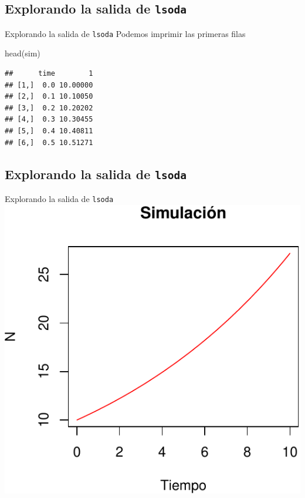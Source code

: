 \documentclass[
  11pt,
  ignorenonframetext,
]{beamer}
\newenvironment{Shaded}{}{}
\newcommand{\FunctionTok}[1]{\textcolor[rgb]{0.02,0.16,0.49}{#1}}
\newcommand{\NormalTok}[1]{#1}
\begin{document}
\hypertarget{explorando-la-salida-de-lsoda}{%
\subsection{\texorpdfstring{Explorando la salida de
\texttt{lsoda}}{Explorando la salida de lsoda}}\label{explorando-la-salida-de-lsoda}}

\begin{frame}[fragile]{Explorando la salida de \texttt{lsoda}}
Podemos imprimir las primeras filas

\begin{Shaded}
\begin{Highlighting}[]
\FunctionTok{head}\NormalTok{(sim)}
\end{Highlighting}
\end{Shaded}

\begin{verbatim}
##      time        1
## [1,]  0.0 10.00000
## [2,]  0.1 10.10050
## [3,]  0.2 10.20202
## [4,]  0.3 10.30455
## [5,]  0.4 10.40811
## [6,]  0.5 10.51271
\end{verbatim}
\end{frame}

\hypertarget{explorando-la-salida-de-lsoda-1}{%
\subsection{\texorpdfstring{Explorando la salida de
\texttt{lsoda}}{Explorando la salida de lsoda}}\label{explorando-la-salida-de-lsoda-1}}

\begin{frame}{Explorando la salida de \texttt{lsoda}}
\includegraphics{deSolve_files/figure-beamer/unnamed-chunk-15-1.pdf}
\end{frame}
\end{document}

